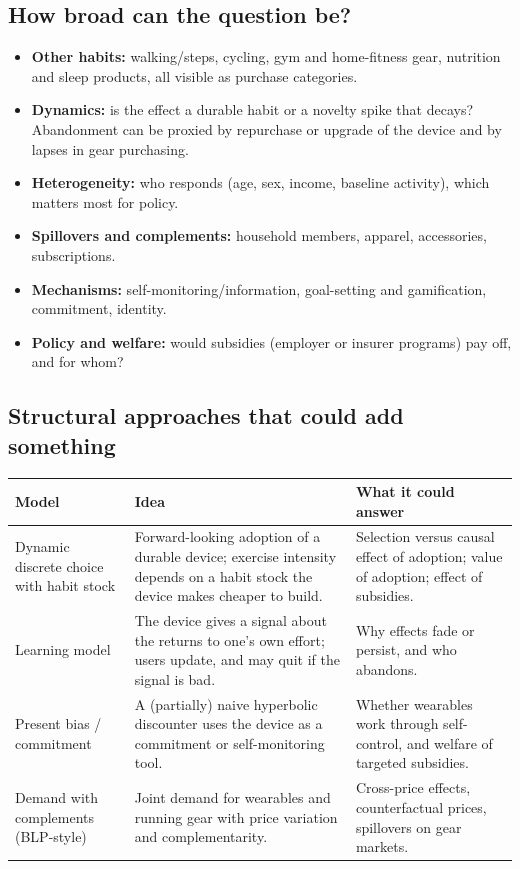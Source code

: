 \documentclass[11pt]{article}
\begin{document}
\subsection*{How broad can the question be?}
\begin{itemize}
  \item \textbf{Other habits:} walking/steps, cycling, gym and home-fitness gear, nutrition and sleep products, all
        visible as purchase categories.
  \item \textbf{Dynamics:} is the effect a durable habit or a novelty spike that decays? Abandonment can be proxied
        by repurchase or upgrade of the device and by lapses in gear purchasing.
  \item \textbf{Heterogeneity:} who responds (age, sex, income, baseline activity), which matters most for policy.
  \item \textbf{Spillovers and complements:} household members, apparel, accessories, subscriptions.
  \item \textbf{Mechanisms:} self-monitoring/information, goal-setting and gamification, commitment, identity.
  \item \textbf{Policy and welfare:} would subsidies (employer or insurer programs) pay off, and for whom?
\end{itemize}

\subsection*{Structural approaches that could add something}
\begin{tabular}{p{}p{}p{}}
\toprule
Model & Idea & What it could answer \\
\midrule
Dynamic discrete choice with habit stock &
  Forward-looking adoption of a durable device; exercise intensity depends on a habit stock the device
  makes cheaper to build. &
  Selection versus causal effect of adoption; value of adoption; effect of subsidies. \\
Learning model &
  The device gives a signal about the returns to one's own effort; users update, and may quit if the signal is bad. &
  Why effects fade or persist, and who abandons. \\
Present bias / commitment &
  A (partially) naive hyperbolic discounter uses the device as a commitment or self-monitoring tool. &
  Whether wearables work through self-control, and welfare of targeted subsidies. \\
Demand with complements (BLP-style) &
  Joint demand for wearables and running gear with price variation and complementarity. &
  Cross-price effects, counterfactual prices, spillovers on gear markets. \\
\bottomrule
\end{tabular}
\end{document}
